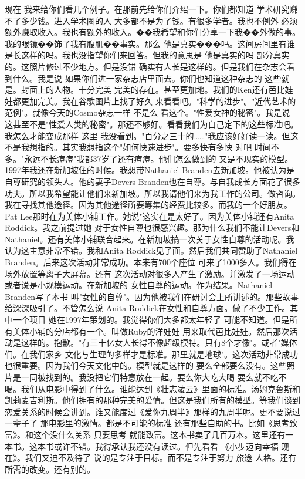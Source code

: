 现在 我来给你们看几个例子。在那前先给你们介绍一下。你们都知道 学术研究赚不了多少钱。进入学术圈的人 大多都不是为了钱。有很多学者。我也不例外 必须额外赚取收入。我也有额外的收入。��我希望和你们分享一下我��外做的事。我的眼镜��饰了我有腹肌��事实。那么 他是真实���吗。这间房间里有谁是长这样的吗。我也没指望你们来回答。但我的意思是 他是真实的吗 部分真实的。这照片修过不少地方。但是没错 确实有人长是这样的。但是我们在杂志会看到什么。我是说 如果你们进一家杂志店里面去。你们也知道这种杂志的 这些就是。封面上的人物。十分完美 完美的存在。甚至更加地。我们的Ken还有芭比娃娃都更加完美。我在谷歌图片上找了好久 来看看吧。"科学的进步"。"近代艺术的范例"。就像今天的Cosmo杂志一样 不是么 看这个。"性爱女神的秘密"。我是说 这甚至不是"性爱人类的秘密"。那还不够好。看看我们为自己定下的这些标准吧。我怎么才能变成那样 这里 我没看到。"百分之三十的……"我应该好好读一读。但这不是我想指的。其实我想指这个"如何快速进步"。要多快有多快 对吧 时间不多。"永远不长痘痘"我都37岁了还有痘痘。他们怎么做到的 又是不现实的模型。1997年我还在新加坡住的时候。我想带Nathaniel Branden去新加坡。他被认为是自尊研究的领头人。他的妻子Devers Branden也在自尊。与自我成长方面花了很多功夫。所以我希望能让他们来新加坡。所以我请他们来为我工作的公司。做咨询。我在寻找其他途径。因为其他途径所要筹集的经费比较多。而我的一个好朋友。Pat Lee那时在为美体小铺工作。她说"这实在是太好了。因为美体小铺还有Anita Roddick。我之前提过她 对于女性自尊也很感兴趣。那为什么我们不能让Devers和Nathaniel。还有美体小铺联合起来。在新加坡搞一次关于女性自尊的活动呢。我认为这主意非常不错。我和Anita Roddick见了面。然后我们共同赞助了Nathaniel Branden。后来这次活动非常成功。本来有700个座位 可来了1000多人。我们得在场外放置等离子大屏幕。还有 这次活动对很多人产生了激励。并激发了一场运动 或者说是小规模运动。在新加坡的 女性自尊的运动。作为结果。Nathaniel Branden写了本书 叫"女性的自尊"。因为他被我们在研讨会上所讲述的。那些故事给深深吸引了。不管怎么说 Anita Roddick在女性和自尊方面。做了不少工作。其中一个项目 她在1997年策划的。我觉得你们大多都太年轻了 可能不知道。但是所有美体小铺的分店都有一个。叫做Ruby的洋娃娃 用来取代芭比娃娃。然后那次活动是这样的。抱歉。"有三十亿女人长得不像超级模特。只有8个才像"。或者"媒体们。在我们家乡 文化与生理的多样才是标准。那里就是地球"。这次活动非常成功 也很重要。因为我们今天文化中的。模型就是这样的 要么全部要么没有。这些照片是一同被找到的。我没把它们特意放在一起。要么你大吃大喝 要么就不吃不喝。我们从电影中得到了什么。谁能达到《壮志凌云》里面的标准。汤姆克鲁斯和凯莉麦吉利斯。他们拥有的那种完美的爱情。但这是我们所有的模型。等我们谈到恋爱关系的时候会讲到。谁又能度过《爱你九周半》那样的九周半呢。更不要说过一辈子了 那电影里的激情。都是不可能的标准 还有那些自助的书。比如《思考致富》。和这个没什么关系 只要思考 就能致富。这本书卖了几百万本。这里还有一本书。这本书或许不错。我得承认我还没有读过。但先看看 《小步迈向幸福 现在》。我们又迫不及待了 说的是专注于目标。而不是专注于努力 旅途 人格。还有所需的改变。还有别的。 

